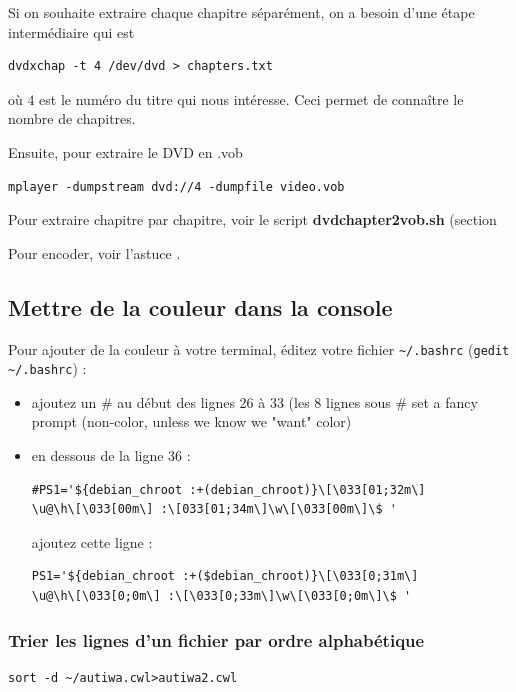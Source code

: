 \documentclass[a4paper,twoside]{article}
\begin{document}
\bigskip

Si on souhaite extraire chaque chapitre séparément, on a besoin d'une étape intermédiaire qui est
\begin{verbatim}
dvdxchap -t 4 /dev/dvd > chapters.txt
\end{verbatim}
où $4$ est le numéro du titre qui nous intéresse. Ceci permet de connaître le nombre de chapitres.

Ensuite, pour extraire le DVD en .vob
\begin{verbatim}
mplayer -dumpstream dvd://4 -dumpfile video.vob
\end{verbatim}

Pour extraire chapitre par chapitre, voir le script \textbf{dvdchapter2vob.sh} (section 

Pour encoder, voir l'astuce .

\subsection{Mettre de la couleur dans la console}
Pour ajouter de la couleur à votre terminal, éditez votre fichier \verb|~/.bashrc| (\verb|gedit ~/.bashrc|) :
\begin{itemize}
\item ajoutez un \# au début des lignes 26 à 33 (les 8 lignes sous \# set a fancy prompt (non-color, unless we know we "want" color)
\item en dessous de la ligne 36 :

\begin{verbatim}
#PS1='${debian_chroot :+(debian_chroot)}\[\033[01;32m\]
\u@\h\[\033[00m\] :\[033[01;34m\]\w\[\033[00m\]\$ '\end{verbatim}

ajoutez cette ligne :

\begin{verbatim}
PS1='${debian_chroot :+($debian_chroot)}\[\033[0;31m\]
\u@\h\[\033[0;0m\] :\[\033[0;33m\]\w\[\033[0;0m\]\$ '
\end{verbatim}
\end{itemize}

\subsubsection{Trier les lignes d'un fichier par ordre alphabétique}

\begin{verbatim}
sort -d ~/autiwa.cwl>autiwa2.cwl
\end{verbatim}
\end{document}
